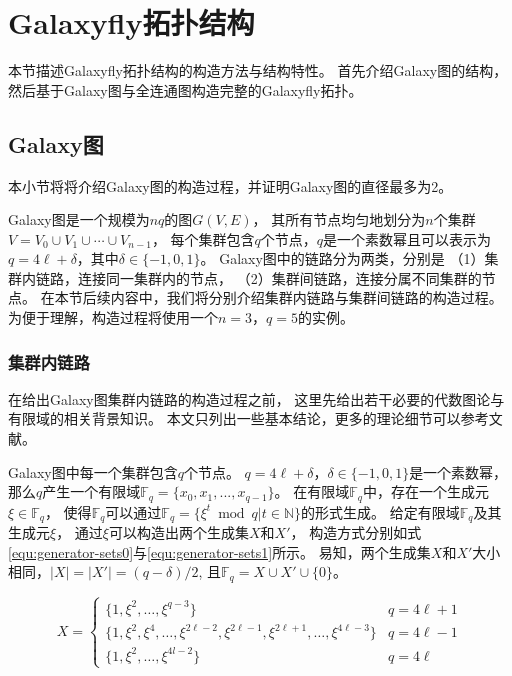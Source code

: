 \section{Galaxyfly拓扑结构}

本节描述Galaxyfly拓扑结构的构造方法与结构特性。
首先介绍Galaxy图的结构，然后基于Galaxy图与全连通图构造完整的Galaxyfly拓扑。

\subsection{Galaxy图}

本小节将将介绍Galaxy图的构造过程，并证明Galaxy图的直径最多为2。

Galaxy图是一个规模为$nq$的图$G(V,E)$，
其所有节点均匀地划分为$n$个集群$V= V_{0}\cup V_{1}\cup \cdots \cup V_{n-1}$，
每个集群包含$q$个节点，$q$是一个素数幂且可以表示为
$q=4\ell+\delta$，其中$\delta\in\{-1,0,1\}$。
Galaxy图中的链路分为两类，分别是
（1）集群内链路，连接同一集群内的节点，
（2）集群间链路，连接分属不同集群的节点。
在本节后续内容中，我们将分别介绍集群内链路与集群间链路的构造过程。
为便于理解，构造过程将使用一个$n=3$，$q=5$的实例。

\subsubsection{集群内链路}
在给出Galaxy图集群内链路的构造过程之前，
这里先给出若干必要的代数图论与有限域的相关背景知识。
本文只列出一些基本结论，更多的理论细节可以参考文献。

Galaxy图中每一个集群包含$q$个节点。
$q=4\ell+\delta$，$\delta\in\{-1,0,1\}$是一个素数幂，
那么$q$产生一个有限域$\mathds{F}_q=\{x_{0},x_{1},...,x_{q-1}\}$。
在有限域$\mathds{F}_q$中，存在一个生成元$\xi \in \mathds{F}_q$，
使得$\mathds{F}_q$可以通过$\mathds{F}_q = \{\xi^t \bmod q | t \in \mathds{N}\}$的形式生成。
给定有限域$\mathds{F}_q$及其生成元$\xi$，
通过$\xi$可以构造出两个生成集$X$和$X'$，
构造方式分别如式\eqref{equ:generator-sets0}与\eqref{equ:generator-sets1}所示。
易知，两个生成集$X$和$X'$大小相同，$|X|=|X'|=(q-\delta)/2$,
且$\mathds{F}_q = X \cup X' \cup \{0\}$。

\begin{equation}\label{equ:generator-sets0}
  X=
  \begin{cases}
    \{1,\xi^2,\ldots,\xi^{q-3}\}& q=4 \ell+1 \\
    \{1,\xi^2,\xi^4,\ldots, \xi^{2\ell-2},\xi^{2\ell-1},\xi^{2\ell+1},\ldots, \xi^{4\ell-3}\} & q=4 \ell-1 \\
    \{1,\xi^2,\ldots,\xi^{4l-2}\} & q=4 \ell
  \end{cases}
\end{equation}

